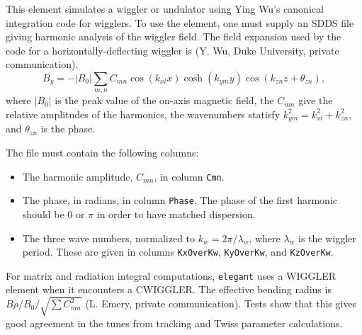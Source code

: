 This element simulates a wiggler or undulator using Ying Wu's
canonical integration code for wigglers.  To use the element, one must
supply an SDDS file giving harmonic analysis of the wiggler field.
The field expansion used by the code for a horizontally-deflecting
wiggler is (Y. Wu, Duke University, private communication).
\begin{equation}
B_y = -\left|B_0\right| \sum_{m,n} C_{mn}\cos(k_{xl} x) \cosh (k_{ym} y)
\cos(k_{zn} z + \theta_{zn}),
\end{equation}
where $\left|B_0\right|$ is the peak value of the on-axis magnetic field,
the $C_{mn}$ give the relative amplitudes of the harmonics, the wavenumbers
statisfy $k^2_{ym} = k^2_{xl} + k^2_{zn}$, and $\theta_{zn}$ is the phase.

The file must contain the following columns:
\begin{itemize}
\item The harmonic amplitude, $C_{mn}$, in column {\tt Cmn}.
\item The phase, in radians, in column {\tt Phase}.  The phase of the first
harmonic should be 0 or $\pi$ in order to have matched dispersion.
\item The three wave numbers, normalized to $k_w = 2\pi/\lambda_w$, where
 $\lambda_w$ is the wiggler period.  These are given in columns 
 {\tt KxOverKw}, {\tt KyOverKw}, and {\tt KzOverKw}.
\end{itemize}

For matrix and radiation integral computations, {\tt elegant} uses a
WIGGLER element when it encounters a CWIGGLER.  The effective bending
radius is $B\rho/B_0/\sqrt{\sum C_{mn}^2}$ (L. Emery, private
communication).  Tests show that this gives good agreement in the
tunes from tracking and Twiss parameter calculations.
